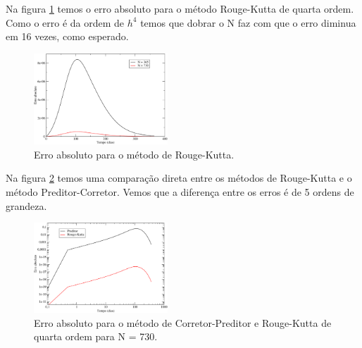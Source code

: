 \documentclass[a4wide]{report}
\begin{document}
Na figura \ref{erroRK} temos o erro absoluto para o método Rouge-Kutta de quarta ordem. Como o erro é da ordem de $h^4$ temos que dobrar o N faz com que o erro diminua em 16 vezes, como esperado.

\begin{figure}[!htb]
\centering
\includegraphics[width=0.447\textwidth]{RKErro.pdf}
\caption{Erro absoluto para o método de Rouge-Kutta. }
\label{erroRK}
\end{figure}


Na figura \ref{errork} temos uma comparação direta entre os métodos de Rouge-Kutta e o método Preditor-Corretor. Vemos que a diferença entre os erros é de 5 ordens de grandeza.




\begin{figure}[!htb]
\centering
\includegraphics[width=0.447\textwidth]{1errork.pdf}
\caption{Erro absoluto para o método de Corretor-Preditor e Rouge-Kutta de quarta ordem para N = 730.}
\label{errork}
\end{figure}
\end{document}
